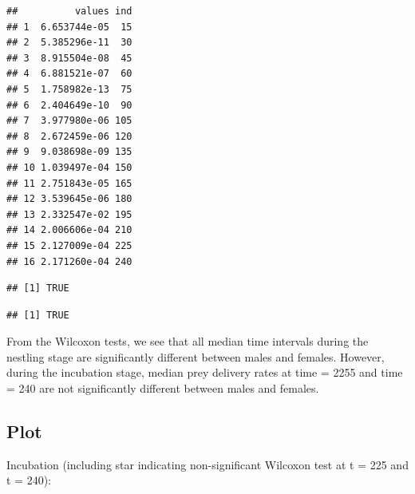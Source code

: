 \documentclass[]{article}
\newenvironment{Shaded}{\begin{snugshade}}{\end{snugshade}}
\newcommand{\CommentTok}[1]{\textcolor[rgb]{0.56,0.35,0.01}{\textit{#1}}}
\newcommand{\FloatTok}[1]{\textcolor[rgb]{0.00,0.00,0.81}{#1}}
\newcommand{\KeywordTok}[1]{\textcolor[rgb]{0.13,0.29,0.53}{\textbf{#1}}}
\newcommand{\NormalTok}[1]{#1}
\newcommand{\OperatorTok}[1]{\textcolor[rgb]{0.81,0.36,0.00}{\textbf{#1}}}
\newcommand{\StringTok}[1]{\textcolor[rgb]{0.31,0.60,0.02}{#1}}
\begin{document}
\begin{verbatim}
##          values ind
## 1  6.653744e-05  15
## 2  5.385296e-11  30
## 3  8.915504e-08  45
## 4  6.881521e-07  60
## 5  1.758982e-13  75
## 6  2.404649e-10  90
## 7  3.977980e-06 105
## 8  2.672459e-06 120
## 9  9.038698e-09 135
## 10 1.039497e-04 150
## 11 2.751843e-05 165
## 12 3.539645e-06 180
## 13 2.332547e-02 195
## 14 2.006606e-04 210
## 15 2.127009e-04 225
## 16 2.171260e-04 240
\end{verbatim}

\begin{Shaded}
\end{Shaded}

\begin{verbatim}
## [1] TRUE
\end{verbatim}

\begin{Shaded}
\end{Shaded}

\begin{verbatim}
## [1] TRUE
\end{verbatim}

From the Wilcoxon tests, we see that all median time intervals during
the nestling stage are significantly different between males and
females. However, during the incubation stage, median prey delivery
rates at time = 2255 and time = 240 are not significantly different
between males and females.

\hypertarget{plot}{%
\subsection{Plot}\label{plot}}

Incubation (including star indicating non-significant Wilcoxon test at t
= 225 and t = 240):
\end{document}
